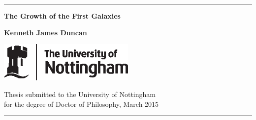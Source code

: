 %
%

\newcommand{\HRule}{\rule{\linewidth}{2mm}}
\begin{titlepage}

\begin{center}

\HRule


\LARGE{\textbf{The Growth of the First Galaxies}}


\large{\textbf{Kenneth James Duncan}}



\includegraphics[width=0.5\textwidth]{un_tf_blk.eps}


	Thesis submitted to the University of Nottingham\\
	for the degree of Doctor of Philosophy, March 2015\\


\HRule
\end{center}

\end{titlepage}


